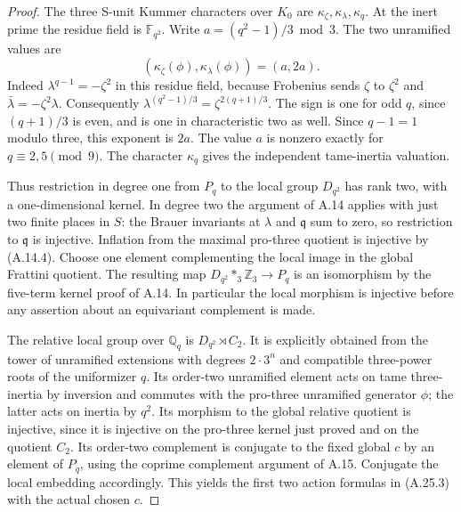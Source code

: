\begin{proof}
The three S-unit Kummer characters over $K_0$ are
$\kappa_\zeta,\kappa_\lambda,\kappa_q$.
At the inert prime the residue field is $\mathbb F_{q^2}$.
Write $a=(q^2-1)/3\bmod3$. The two unramified values
are
\[
 (\kappa_\zeta(\phi),\kappa_\lambda(\phi))=(a,2a).
 \tag{A.25.4}
\]
Indeed $\lambda^{q-1}=-\zeta^2$ in this residue field,
because Frobenius sends $\zeta$ to $\zeta^2$ and
$\bar\lambda=-\zeta^2\lambda$. Consequently
$\lambda^{(q^2-1)/3}=\zeta^{2(q+1)/3}$.
The sign is one for odd $q$, since $(q+1)/3$ is even,
and is one in characteristic two as well. Since
$q-1=1$ modulo three, this exponent is $2a$.
The value $a$ is nonzero exactly for
$q\equiv2,5\pmod9$. The character $\kappa_q$ gives
the independent tame-inertia valuation.

Thus restriction in degree one from $P_q$ to the local
group $D_{q^2}$ has rank two, with a one-dimensional
kernel. In degree two the argument of A.14 applies
with just two finite places in $S$: the Brauer
invariants at $\lambda$ and $\mathfrak q$ sum to zero,
so restriction to $\mathfrak q$ is injective. Inflation
from the maximal pro-three quotient is injective by
(A.14.4). Choose one element complementing the local
image in the global Frattini quotient. The resulting
map $D_{q^2}*_{3}\mathbb Z_3\to P_q$ is an
isomorphism by the five-term kernel proof of A.14.
In particular the local morphism is injective before
any assertion about an equivariant complement is made.

The relative local group over $\mathbb Q_q$ is
$D_{q^2}\rtimes C_2$. It is explicitly obtained from
the tower of unramified extensions with degrees
$2\cdot3^n$ and compatible three-power roots of the
uniformizer $q$. Its order-two unramified element
acts on tame three-inertia by inversion and commutes
with the pro-three unramified generator $\phi$;
the latter acts on inertia by $q^2$. Its morphism
to the global relative quotient is injective, since
it is injective on the pro-three kernel just proved
and on the quotient $C_2$. Its order-two complement
is conjugate to the fixed global $c$ by an element
of $P_q$, using the coprime complement argument of
A.15. Conjugate the local embedding accordingly.
This yields the first two action formulas in
(A.25.3) with the actual chosen $c$.


\end{proof}
